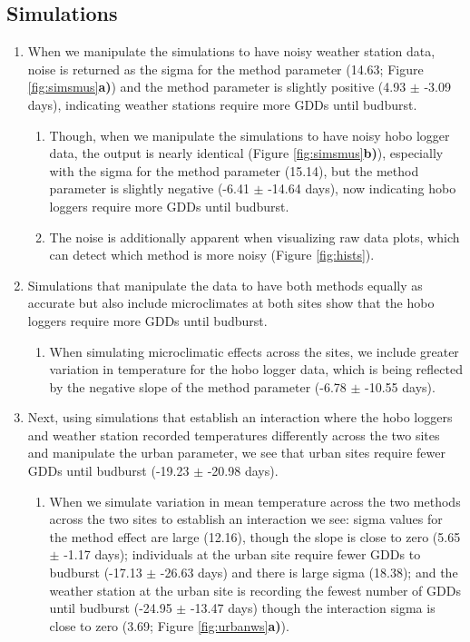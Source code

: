 \documentclass{article}\usepackage[]{graphicx}\usepackage[]{color}
\begin{document}
\subsection*{Simulations}
\begin{enumerate}
\item When we manipulate the simulations to have noisy weather station data, noise is returned as the sigma for the method parameter (14.63; Figure \ref{fig:simsmus}\textbf{a)}) and the method parameter is slightly positive (4.93 $\pm$ -3.09 days), indicating weather stations require more GDDs until budburst. 
  \begin{enumerate}
  \item Though, when we manipulate the simulations to have noisy hobo logger data, the output is nearly identical (Figure \ref{fig:simsmus}\textbf{b)}), especially with the sigma for the method parameter (15.14), but the method parameter is slightly negative (-6.41 $\pm$ -14.64 days), now indicating hobo loggers require more GDDs until budburst.
  \item The noise is additionally apparent when visualizing raw data plots, which can detect which method is more noisy (Figure \ref{fig:hists}).
  \end{enumerate}
  
\item Simulations that manipulate the data to have both methods equally as accurate but also include microclimates at both sites show that the hobo loggers require more GDDs until budburst. 
  \begin{enumerate}
  \item When simulating microclimatic effects across the sites, we include greater variation in temperature for the hobo logger data, which is being reflected by the negative slope of the method parameter (-6.78 $\pm$ -10.55 days). 
  \end{enumerate}
  
\item Next, using simulations that establish an interaction where the hobo loggers and weather station recorded temperatures differently across the two sites and manipulate the urban parameter, we see that urban sites require fewer GDDs until budburst (-19.23 $\pm$ -20.98 days).
  \begin{enumerate}
  \item When we simulate variation in mean temperature across the two methods across the two sites to establish an interaction we see: sigma values for the method effect are large (12.16), though the slope is close to zero (5.65 $\pm$ -1.17 days); individuals at the urban site require fewer GDDs to budburst (-17.13 $\pm$ -26.63 days) and there is large sigma (18.38); and the weather station at the urban site is recording the fewest number of GDDs until budburst (-24.95 $\pm$ -13.47 days) though the interaction sigma is close to zero (3.69; Figure \ref{fig:urbanws}\textbf{a)}).
  \end{enumerate}
\end{enumerate}
\end{document}
